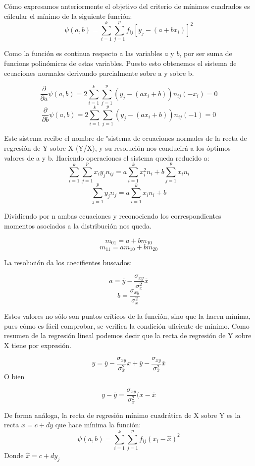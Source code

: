 \documentclass{article}
\begin{document}
	Cómo expresamos anteriormente el objetivo del criterio de mínimos cuadrados es cálcular el mínimo de la siguiente función: 
	$$\psi (a,b) = \sum_{i=1}^k \sum_{j=1}^p f_{ij} [ y_j - (a+bx_i)]^2 $$
	
	Como la función es continua respecto a las variables $a$ y $b$, por ser suma de funcions polinómicas de estas variables. Puesto esto obtenemos el sistema de ecuaciones normales derivando parcialmente sobre a y sobre b.
	
	$$ \frac{\partial}{\partial a} \psi(a,b) = 2 \sum_{i=1}^k \sum_{j=1}^p ( y_j - (ax_i +b )) n_{ij} (-x_i) = 0 $$
	$$ \frac{\partial}{\partial b} \psi(a,b) = 2 \sum_{i=1}^k \sum_{j=1}^p ( y_j - (ax_i +b )) n_{ij} (-1) = 0 $$
	
	Este sistema recibe el nombre de "sistema de ecuaciones normales de la recta de regresión de Y sobre X (Y/X), y su resolución nos conducirá a los óptimos valores de a y b. Haciendo operaciones el sistema queda reducido a:
	$$  \sum_{i=1}^k \sum_{j=1}^p x_i y_j n_{ij}  = a \sum_{i=1}^k x_i^2 n_i + b\sum_{j= 1}^p x_i n_i $$
	$$ \sum_{j=1}^p y_j n_j = a \sum_{i=1}^k x_i n_i + b $$
	
	Dividiendo por n ambas ecuaciones y reconociendo los correspondientes momentos asociados a la distribución nos queda.
	
	$$
	m_{01} = a + bm_{10}$$
	$$
	m_{11} = am_{10} + bm_{20}
	$$	
	
	La resolución da los coecifientes buscados:
	
	$$
	a = \overline{y} - \frac{\sigma_{xy}}{\sigma_x^2} \overline{x}
$$	 
$$  b = \frac{\sigma_{xy}}{\sigma_x^2} $$
	 
	 Estos valores no sólo son puntos críticos de la función, sino que la hacen mínima, pues cómo es fácil comprobar, se verifica la condición uficiente de mínimo. Como resumen de la regresión lineal podemos decir que la recta de regresión de Y sobre X tiene por expresión.
	 
	$$ y = \overline{y} - \frac{\sigma_{xy}}{\sigma_x^2} x + \overline{y} - \frac{\sigma_{xy}}{\sigma_x^2} \overline{x}$$
	O bien
	
	$$ y - \overline{y} = \frac{\sigma_{xy}}{\sigma_x^2} (x - \overline{x} $$
	
	De forma análoga, la recta de regresión mínimo cuadrática de X sobre Y es la recta $x = c +dy$ que hace mínima la función:
		$$\psi (a,b) = \sum_{i=1}^k \sum_{j=1}^p f_{ij} (x_i - \hat{x})^2 $$
	Donde $\hat{x} = c +dy_j $
	
	\vspace{2mm}
	
\end{document}
